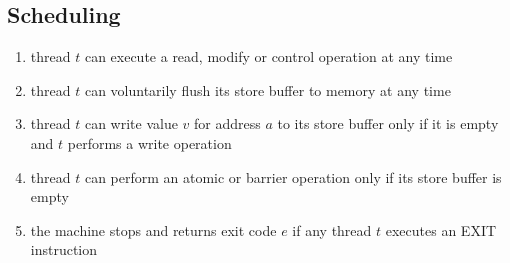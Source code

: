 \newpage
\subsection{Scheduling}

\begin{enumerate}
  \item thread $t$ can execute a read, modify or control operation at any time
  \item thread $t$ can voluntarily flush its store buffer to memory at any time
  \item thread $t$ can write value $v$ for address $a$ to its store buffer only if it is empty and $t$ performs a write operation
  \item thread $t$ can perform an atomic or barrier operation only if its store buffer is empty
  \item the machine stops and returns exit code $e$ if any thread $t$ executes an EXIT instruction
\end{enumerate}

